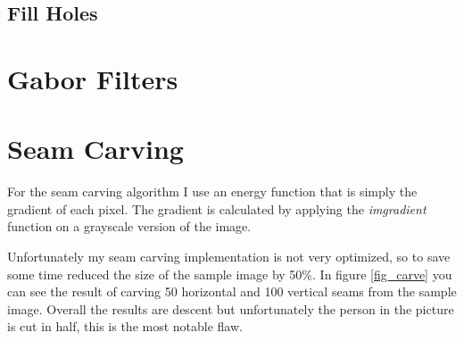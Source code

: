 \documentclass[12pt]{article}
\begin{document}
\subsection{Fill Holes}


\section{Gabor Filters}

\section{}

\section{}

\section{}

\section{Seam Carving}

For the seam carving algorithm I use an energy function that is simply the gradient of each pixel. The gradient is calculated by applying the \textit{imgradient} function on a grayscale version of the image.

Unfortunately my seam carving implementation is not very optimized, so to save some time reduced the size of the sample image by 50\%.
In figure \ref{fig_carve} you can see the result of carving 50 horizontal and 100 vertical seams from the sample image. Overall the results are descent but unfortunately the person in the picture is cut in half, this is the most notable flaw. 
\end{document}
